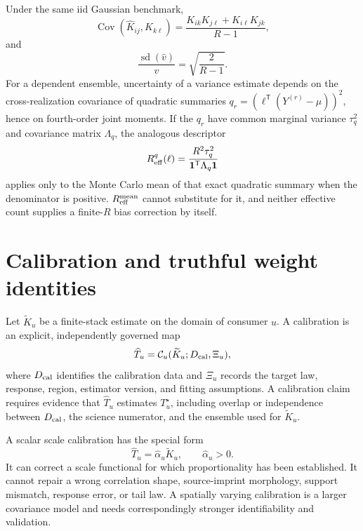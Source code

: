 \documentclass[11pt]{article}
\newcommand{\Cov}{\operatorname{Cov}}
\newcommand{\one}{\bm{1}}
\begin{document}
Under the same iid Gaussian benchmark,
\begin{equation}
  \Cov(\widehat K_{ij},\widehat K_{k\ell})
  =\frac{K_{ik}K_{j\ell}+K_{i\ell}K_{jk}}{R-1},
  \label{eq:wishart-entry-covariance}
\end{equation}
and
\begin{equation}
  \frac{\operatorname{sd}(\widehat v)}{v}
  =\sqrt{\frac{2}{R-1}}.
  \label{eq:variance-relative-error}
\end{equation}
For a dependent ensemble, uncertainty of a variance estimate depends on the
cross-realization covariance of quadratic summaries
$q_r=(\ell^{\mathsf T}(Y^{(r)}-\mu))^2$, hence on fourth-order joint moments.
If the $q_r$ have common marginal variance $\tau_q^2$ and covariance matrix
$\Lambda_q$, the analogous descriptor
\begin{equation}
  R_{\rm eff}^{q}(\ell)
  =\frac{R^2\tau_q^2}{\one^{\mathsf T}\Lambda_q\one}
  \label{eq:quadratic-effective-count}
\end{equation}
applies only to the Monte Carlo mean of that exact quadratic summary when the
denominator is positive.  $R_{\rm eff}^{\rm mean}$ cannot substitute for it,
and neither effective count supplies a finite-$R$ bias correction by itself.

\section{Calibration and truthful weight identities}

Let $\widetilde K_u$ be a finite-stack estimate on the domain of consumer
$u$.  A calibration is an explicit, independently governed map
\begin{equation}
  \widehat T_u
  =\mathcal C_u(\widetilde K_u;D_{\rm cal},\Xi_u),
  \label{eq:calibration-operator}
\end{equation}
where $D_{\rm cal}$ identifies the calibration data and $\Xi_u$ records the
target law, response, region, estimator version, and fitting assumptions.  A
calibration claim requires evidence that $\widehat T_u$ estimates
$T_u^\star$, including overlap or independence between $D_{\rm cal}$, the
science numerator, and the ensemble used for $\widetilde K_u$.

A scalar scale calibration has the special form
\begin{equation}
  \widehat T_u=\widehat\alpha_u\widetilde K_u,
  \qquad \widehat\alpha_u>0.
  \label{eq:scalar-calibration}
\end{equation}
It can correct a scale functional for which proportionality has been
established.  It cannot repair a wrong correlation shape, source-imprint
morphology, support mismatch, response error, or tail law.  A spatially varying
calibration is a larger covariance model and needs correspondingly stronger
identifiability and validation.
\end{document}

